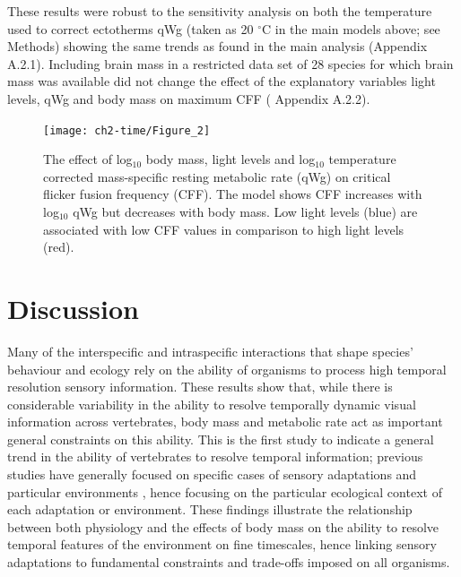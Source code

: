 These results were robust to the sensitivity analysis on both the temperature used to correct ectotherms qWg (taken as 20 $^{\circ}$C in the main models above; see Methods) showing the same trends as found in the main analysis (Appendix A.2.1). Including brain mass in a restricted data set of 28 species for which brain mass was available did not change the effect of the explanatory variables light levels, qWg and body mass on maximum CFF ( Appendix A.2.2).


\begin{figure}[h!]
  \centering
  \texttt{[image: ch2-time/Figure\_2]}
  \caption[ ]{The effect of log$_{10}$ body mass, light levels and log$_{10}$ temperature corrected mass-specific resting metabolic rate (qWg) on critical flicker fusion frequency (CFF). The model shows CFF increases with log$_{10}$ qWg but decreases with body mass. Low light levels (blue) are associated with low CFF values in comparison to high light levels (red).}
  \label{fig:Figure 2.3}
\end{figure}


\section{Discussion}
Many of the interspecific and intraspecific interactions that shape species' behaviour and ecology rely on the ability of organisms to process high temporal resolution sensory information. These results show that, while there is considerable variability in the ability to resolve temporally dynamic visual information across vertebrates, body mass and metabolic rate act as important general constraints on this ability. This is the first study to indicate a general trend in the ability of vertebrates to resolve temporal information; previous studies have generally focused on specific cases of sensory adaptations \citep{fritsches2005warm} and particular environments \citep{frank1999comparative,frank2012light}, hence focusing on the particular ecological context of each adaptation or environment. These findings illustrate the relationship between both physiology and the effects of body mass on the ability to resolve temporal features of the environment on fine timescales, hence linking sensory adaptations to fundamental constraints and trade-offs imposed on all organisms.


